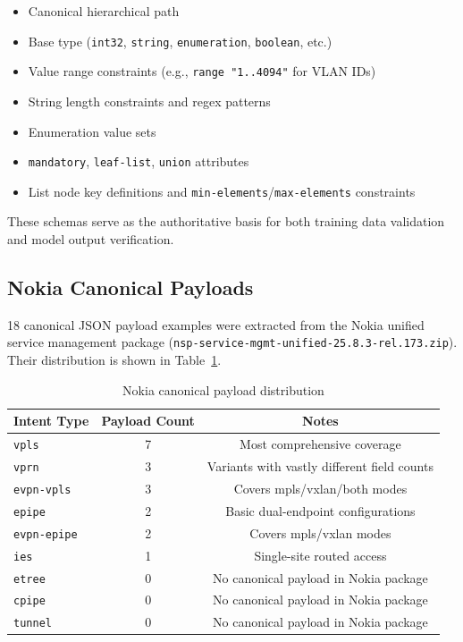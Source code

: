 \documentclass[12pt, a4paper]{article}
\newcommand{\intenttype}[1]{\texttt{#1}}
\begin{document}
\begin{itemize}
  \item Canonical hierarchical path
  \item Base type (\texttt{int32}, \texttt{string}, \texttt{enumeration}, \texttt{boolean}, etc.)
  \item Value range constraints (e.g., \texttt{range "1..4094"} for VLAN IDs)
  \item String length constraints and regex patterns
  \item Enumeration value sets
  \item \texttt{mandatory}, \texttt{leaf-list}, \texttt{union} attributes
  \item List node key definitions and \texttt{min-elements}/\texttt{max-elements} constraints
\end{itemize}

\noindent
These schemas serve as the authoritative basis for both training data validation and model output verification.

\subsection{Nokia Canonical Payloads}

18 canonical JSON payload examples were extracted from the Nokia unified service management package (\texttt{nsp-service-mgmt-unified-25.8.3-rel.173.zip}). Their distribution is shown in Table~\ref{tab:canonical-payloads}.

\begin{table}[H]
\centering
\caption{Nokia canonical payload distribution}
\label{tab:canonical-payloads}
\small
\begin{tabular}{lcc}
\toprule
\textbf{Intent Type} & \textbf{Payload Count} & \textbf{Notes} \\
\midrule
\intenttype{vpls}        & 7 & Most comprehensive coverage \\
\intenttype{vprn}        & 3 & Variants with vastly different field counts \\
\intenttype{evpn-vpls}   & 3 & Covers mpls/vxlan/both modes \\
\intenttype{epipe}       & 2 & Basic dual-endpoint configurations \\
\intenttype{evpn-epipe}  & 2 & Covers mpls/vxlan modes \\
\intenttype{ies}         & 1 & Single-site routed access \\
\midrule
\intenttype{etree}       & 0 & No canonical payload in Nokia package \\
\intenttype{cpipe}       & 0 & No canonical payload in Nokia package \\
\intenttype{tunnel}      & 0 & No canonical payload in Nokia package \\
\bottomrule
\end{tabular}
\end{table}
\end{document}

